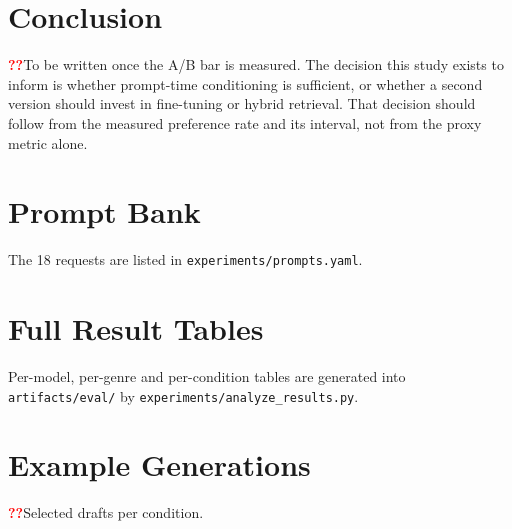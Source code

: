 \documentclass[11pt]{article}
\newcommand{\pending}[1][??]{\textcolor{red}{\textbf{#1}}}
\begin{document}
\section{Conclusion}
\label{sec:conclusion}

\pending{To be written once the A/B bar is measured.} The decision this study
exists to inform is whether prompt-time conditioning is sufficient, or whether a
second version should invest in fine-tuning or hybrid retrieval. That decision
should follow from the measured preference rate and its interval, not from the
proxy metric alone.



\appendix

\section{Prompt Bank}
\label{app:prompts}
The 18 requests are listed in \texttt{experiments/prompts.yaml}.

\section{Full Result Tables}
\label{app:tables}
Per-model, per-genre and per-condition tables are generated into
\texttt{artifacts/eval/} by \texttt{experiments/analyze\_results.py}.

\section{Example Generations}
\label{app:examples}
\pending{Selected drafts per condition.}
\end{document}

